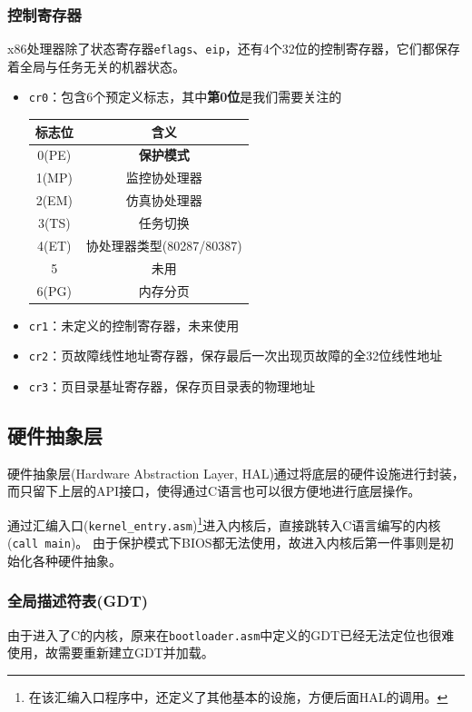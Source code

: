 \documentclass[logo,reportComp]{thesis}
\begin{document}
\subsubsection{控制寄存器}
\label{sub:cr}
x86处理器除了状态寄存器\verb'eflags'、\verb'eip'，还有4个32位的控制寄存器，它们都保存着全局与任务无关的机器状态。
\begin{itemize}
	\item \verb'cr0'：包含6个预定义标志，其中\textbf{第0位}是我们需要关注的
	\begin{center}
	\begin{tabular}{|c|c|}\hline
	\textbf{标志位} & \textbf{含义}\\\hline
	0(PE) & \textbf{保护模式} \\\hline
	1(MP) & 监控协处理器\\\hline
	2(EM) & 仿真协处理器\\\hline
	3(TS) & 任务切换\\\hline
	4(ET) & 协处理器类型(80287/80387)\\\hline
	5 & 未用\\\hline
	6(PG) & 内存分页\\\hline
	\end{tabular}
	\end{center}
	\item \verb'cr1'：未定义的控制寄存器，未来使用
	\item \verb'cr2'：页故障线性地址寄存器，保存最后一次出现页故障的全32位线性地址
	\item \verb'cr3'：页目录基址寄存器，保存页目录表的物理地址
\end{itemize}

\subsection{硬件抽象层}
硬件抽象层(Hardware Abstraction Layer, HAL)通过将底层的硬件设施进行封装，而只留下上层的API接口，使得通过C语言也可以很方便地进行底层操作。

通过汇编入口(\verb'kernel_entry.asm')\footnote{在该汇编入口程序中，还定义了其他基本的设施，方便后面HAL的调用。}进入内核后，直接跳转入C语言编写的内核(\verb'call main')。
由于保护模式下BIOS都无法使用，故进入内核后第一件事则是初始化各种硬件抽象。

\subsubsection{全局描述符表(GDT)}
由于进入了C的内核，原来在\verb'bootloader.asm'中定义的GDT已经无法定位也很难使用，故需要重新建立GDT并加载。
\end{document}
